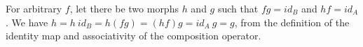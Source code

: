\tikzset{
  ->,  %
  node distance=4cm, %
}
\quad
\begin{center}\end{center}
For arbitrary $f$, let there be two morphs $h$ and $g$ such that $f g = id_B$ and $h f = id_A$. We have $h = h ~ id_B = h (f g) = (h f) g = id_A ~ g = g$, from the definition of the identity map and associativity of the composition operator.
